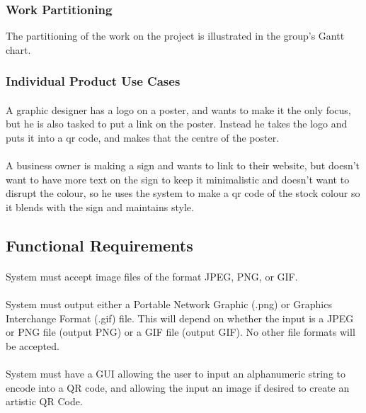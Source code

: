 \documentclass[12pt, titlepage]{article}
\begin{document}
\subsubsection{Work Partitioning}

	The partitioning of the work on the project is illustrated in the group's 
	Gantt chart.

\subsubsection{Individual Product Use Cases}

	\paragraph{}
	A graphic designer has a logo on a poster, and wants to make it the only 
	focus, but he is also tasked to put a link on the poster. Instead he takes 
	the logo and puts it into a qr code, and makes that the centre of the 
	poster.
	\paragraph{}
	 A business owner is making a sign and wants to link to their website, but 
	 doesn't want to have more text on the sign to keep it minimalistic and 
	 doesn't want to disrupt the colour, so he uses the system to make a qr 
	 code of the stock colour so it blends with the sign and maintains style.
	

\subsection{Functional Requirements}

	\paragraph{}
	System must accept image files of the format JPEG, PNG, or GIF.
	\paragraph{}
	System must output either a Portable Network Graphic (.png) or Graphics 
	Interchange Format (.gif) file. This will depend on whether the input is a 
	JPEG or PNG file (output PNG) or a GIF file (output GIF). No other file 
	formats will be accepted. 
	\paragraph{}
	System must have a GUI allowing the user to input an alphanumeric string to 
	encode into a QR code, and allowing the input an image %
	 if desired to create 
	an artistic QR Code.
\end{document}
